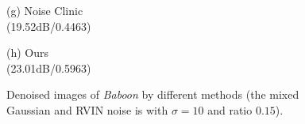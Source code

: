 \documentclass[runningheads]{llncs}
\begin{document}
\begin{figure}
{\begin{minipage}[t]{0.244\textwidth}
{\footnotesize (g) Noise Clinic \\(19.52dB/0.4463)}
\end{minipage}
\begin{minipage}[t]{0.244\textwidth}
\centering
{}
{\footnotesize (h) Ours \\(23.01dB/0.5963)}
\end{minipage}
}
\caption{Denoised images of \textsl{Baboon} by different methods (the mixed Gaussian and RVIN noise is with $\sigma = 10$ and ratio $0.15$).}
\label{fig10}
\end{figure}
\end{document}
